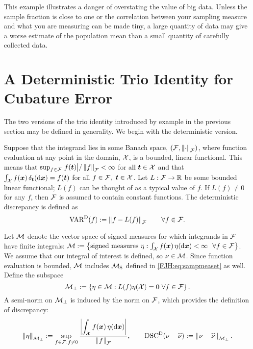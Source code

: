 \documentclass[graybox,footinfo]{svmult}
\begin{document}
This example illustrates a danger of overstating the value of  big data. Unless 
the 
sample fraction is close to one or the correlation between 
your sampling measure and what you are measuring can be made tiny, a large quantity of 
data may give a worse estimate of the population mean than a small quantity of carefully 
collected data.

\begin{FJHLesson}
	\FJHLessonOne
\end{FJHLesson}

\section{A Deterministic Trio Identity for Cubature Error} \label{FJH:sec:dettrio}
The two versions of the trio identity introduced by example in the previous section may 
be defined in generality. We begin with the deterministic version.  

Suppose that the integrand lies in some Banach space, $({\mathcal{F}},\left \lVert \cdot \right \rVert_{{\mathcal{F}}})$, 
where 
function 
evaluation at any point  in the 
domain,  ${\mathcal{X}}$, is a 
bounded, linear functional.  This means that $\sup_{f \in {\mathcal{F}}} 
\bigl \lvert f({\boldsymbol{t}}) \bigr \rvert/\left \lVert f \right \rVert_{{\mathcal{F}}} < 
\infty$ for all ${\boldsymbol{t}} \in {\mathcal{X}}$ and that $\int_{{\mathcal{X}}} f({\boldsymbol{x}}) \, \delta_{{\boldsymbol{t}}}(\mathrm{d}{\boldsymbol{x}}) 
=f({\boldsymbol{t}})$ 
for all $f \in {\mathcal{F}}, \ {\boldsymbol{t}} \in {\mathcal{X}}$.  Let $L :{\mathcal{F}} \to {\mathbb{R}}$ be some bounded 
linear functional; $L(f)$ can be thought of as a typical value of $f$.  If $L(f) \ne 0$ for 
any $f$, then ${\mathcal{F}}$ is assumed to contain  
constant functions.  The deterministic discrepancy is defined as
\begin{equation}  \label{FJH:eq:detvardef}
\Var^{\Dt}(f) := \norm{f- L(f)}_{\calF} \qquad \forall f \in \calF.
\end{equation} 

Let ${\mathcal{M}}$ denote the vector space of signed measures for which integrands in 
${\mathcal{F}}$ 
have finite integrals: $\calM : = \bigl \{\text{signed measures } \eta : \int_{\calX} f(\bsx) 
\, \eta(\D\bsx) < \infty \ 
\ 
\forall f \in \calF \bigr \}$.
We assume that our integral of interest is defined, so $\nu \in {\mathcal{M}}$.  Since function 
evaluation is bounded, ${\mathcal{M}}$ includes ${\mathcal{M}}_{\textup{S}}$ defined in 
\eqref{FJH:eq:sampmeaset} as well.  Define the subspace  
\begin{equation} \label{FJH:eq:Mperpdef}
\calM_\bot : = \left \{\eta \in \calM :  L(f) \eta(\calX) = 0  \ \forall f \in \calF
\right\}.
\end{equation} 
A semi-norm on ${\mathcal{M}}_\bot$ is induced by the norm on ${\mathcal{F}}$, which provides the 
definition of discrepancy:
\begin{equation} \label{FJH:eq:detdiscdef}
\norm{\eta}_{\calM_\bot}  : =\sup_{f \in \calF : f \ne 0} \frac{\displaystyle 
\biggabs{\int_{\calX} 
f(\bsx) \, \eta(\D \bsx)}}{\norm{f}_{\calF}}, \qquad \disc^\Dt(\nu - \hnu) : = \norm{\nu - 
\hnu}_{\calM_\bot}.
\end{equation}
\end{document}
